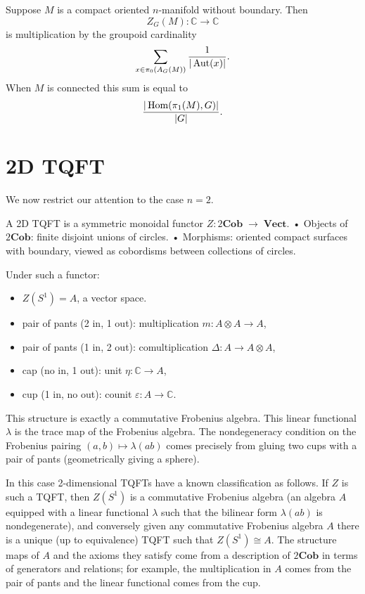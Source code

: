 \documentclass[12pt]{article}
\begin{document}
\begin{example}
Suppose $M$ is a compact oriented $n$-manifold without boundary. Then 
\[
Z_G(M) : \mathbb{C} \to \mathbb{C}
\]
is multiplication by the groupoid cardinality
\[
\sum_{x \in \pi_0(A_G(M))} \frac{1}{|\operatorname{Aut}(x)|}.
\]
When $M$ is connected this sum is equal to
\[
\frac{|\operatorname{Hom}(\pi_1(M),G)|}{|G|}.
\]
\end{example}
\section{2D TQFT}
We now restrict our attention to the case $n=2$.

A 2D TQFT is a symmetric monoidal functor
$Z : 2\mathbf{Cob} \;\to\; \mathbf{Vect}$.
    •	Objects of $2\mathbf{Cob}$: finite disjoint unions of circles.
    •	Morphisms: oriented compact surfaces with boundary, viewed as cobordisms between collections of circles.

Under such a functor:
\begin{itemize}
    \item $Z(S^1) = A$, a vector space.
    \item pair of pants (2 in, 1 out): multiplication $m:A\otimes A\to A$,
    \item pair of pants (1 in, 2 out): comultiplication $\Delta:A\to A\otimes A$,
    \item cap (no in, 1 out): unit $\eta:\mathbb{C}\to A$,
    \item cup (1 in, no out): counit $\varepsilon:A\to\mathbb{C}$.
\end{itemize}
This structure is exactly a commutative Frobenius algebra. This linear functional $\lambda$ is the trace map of the Frobenius algebra. The nondegeneracy condition on the Frobenius pairing $(a,b)\mapsto \lambda(ab)$ comes precisely from gluing two cups with a pair of pants (geometrically giving a sphere).

In this case 2-dimensional TQFTs have a known classification as follows. If $Z$ is such a TQFT, then $Z(S^1)$ is a commutative Frobenius algebra (an algebra $A$ equipped with a linear functional $\lambda$ such that the bilinear form $\lambda(ab)$ is nondegenerate), and conversely given any commutative Frobenius algebra $A$ there is a unique (up to equivalence) TQFT such that $Z(S^1)\cong A$. The structure maps of $A$ and the axioms they satisfy come from a description of $2\mathbf{Cob}$ in terms of generators and relations; for example, the multiplication in $A$ comes from the pair of pants and the linear functional comes from the cup.
\end{document}
